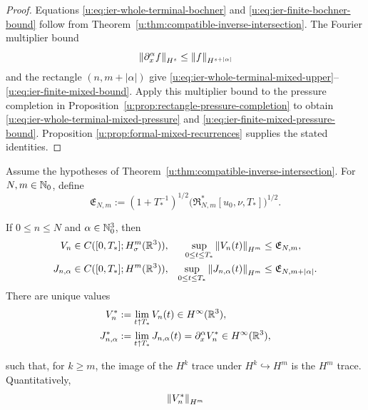 \begin{proof}
Equations \eqref{u:eq:ier-whole-terminal-bochner} and
\eqref{u:eq:ier-finite-bochner-bound} follow from
Theorem~\ref{u:thm:compatible-inverse-intersection}.  The Fourier multiplier
bound
\[
 \left\lVert \partial_x^\alpha f\right\rVert_{H^s}
 \le\left\lVert f\right\rVert_{H^{s+|\alpha|}}
\]
and the rectangle \((n,m+|\alpha|)\) give
\eqref{u:eq:ier-whole-terminal-mixed-upper}--%
\eqref{u:eq:ier-finite-mixed-bound}.  Apply this multiplier bound to the
pressure completion in Proposition~\ref{u:prop:rectangle-pressure-completion}
to obtain \eqref{u:eq:ier-whole-terminal-mixed-pressure} and
\eqref{u:eq:ier-finite-mixed-pressure-bound}.  Proposition
\ref{u:prop:formal-mixed-recurrences} supplies the stated identities.
\end{proof}

\begin{theorem}
\label{u:thm:ier-compatible-endpoint-traces}
Assume the hypotheses of
Theorem~\ref{u:thm:compatible-inverse-intersection}.
For \(N,m\in\mathbb N_0\), define
\begin{equation}
 \mathfrak E_{N,m}
 :=(1+T_*^{-1})^{1/2}
 \bigl(\mathfrak R_{N,m}^*[u_0,\nu,T_*]\bigr)^{1/2}.
 \label{u:eq:ier-endpoint-majorant}
\end{equation}
\begin{samepage}
If \(0\le n\le N\) and \(\alpha\in\mathbb N_0^3\), then
\begin{align}
 V_n&\in C([0,T_*];H^m_\sigma(\mathbb R^3)),
 &\sup_{0\le t\le T_*}\left\lVert V_n(t)\right\rVert_{H^m}
 &\le\mathfrak E_{N,m},
 \label{u:eq:ier-row-trace}\\
 J_{n,\alpha}&\in C([0,T_*];H^m(\mathbb R^3)),
 &\sup_{0\le t\le T_*}\left\lVert J_{n,\alpha}(t)\right\rVert_{H^m}
 &\le\mathfrak E_{N,m+|\alpha|}.
 \label{u:eq:ier-mixed-row-trace}
\end{align}
There are unique values
\begin{align}
 V_n^*&:=\lim_{t\uparrow T_*}V_n(t)
 \in H^\infty(\mathbb R^3),
 \label{u:eq:ier-velocity-endpoint}\\
 J_{n,\alpha}^*&:=\lim_{t\uparrow T_*}J_{n,\alpha}(t)
 =\partial_x^\alpha V_n^*
 \in H^\infty(\mathbb R^3),
 \label{u:eq:ier-mixed-velocity-endpoint}
\end{align}
\par
\end{samepage}
such that, for \(k\ge m\), the image of the \(H^k\) trace under
\(H^k\hookrightarrow H^m\) is the \(H^m\) trace.  Quantitatively,
\begin{align}
 \norm{V_n^*}_{H^m}

\end{align}
\end{theorem}
